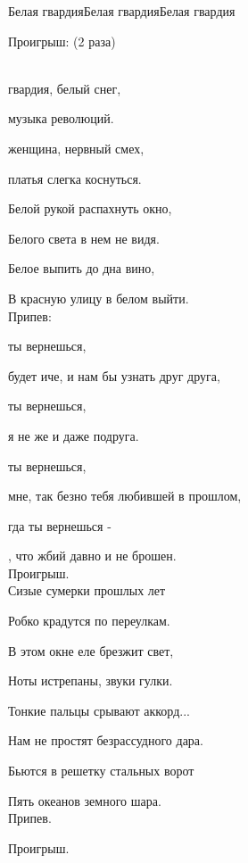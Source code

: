 \documentclass[11pt,a5paper]{book}
\renewcommand{\tt}{\indent \indent}
\begin{document}
\begin{song}{Белая гвардия}{}{Белая гвардия}{Белая гвардия}{}{}

Проигрыш: (2 раза)\par 
{}      \\

 гвардия, белый снег,\par
{} музыка революций.\par
{} женщина, нервный смех,\par
{} платья слегка коснуться.\par
 
Белой рукой распахнуть окно,\par
Белого света в нем не видя.\par
Белое выпить до дна вино,\par
В красную улицу в белом выйти.\\

Припев:\par
{} ты вернешься,\par
{} будет иче, и нам бы узнать друг друга,\par
{} ты вернешься,\par
{} я не же и даже  подруга.\par
{} ты вернешься,\par
{} мне, так безно тебя любившей в прошлом,\par
\tt{}гда ты вернешься -\par
{}, что жбий давно и не  брошен.\\

Проигрыш.\\
 
\newpage
Сизые сумерки прошлых лет\par
Робко крадутся по переулкам.\par
В этом окне еле брезжит свет,\par
Ноты истрепаны, звуки гулки.\par
Тонкие пальцы срывают аккорд...\par
Нам не простят безрассудного дара.\par
Бьются в решетку стальных ворот\par
Пять океанов земного шара.\\

Припев. \par
Проигрыш.\\
 

\end{song}
\end{document}
